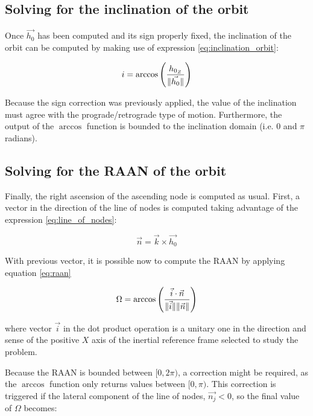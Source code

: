 \subsection{Solving for the inclination of the orbit}

Once $\vec{h_{0}}$ has been computed and its sign properly fixed, the
inclination of the orbit can be computed by making use of expression
\ref{eq:inclination_orbit}:

\begin{equation}
  i = \arccos{\left(\frac{h_{0_{Z}}}{\lVert\vec{h_{0}}\rVert} \right)}
  \label{eq:inclination_orbit}
\end{equation}

Because the sign correction was previously applied, the value of the inclination
must agree with the prograde/retrograde type of motion. Furthermore, the output
of the $\arccos$ function is bounded to the inclination domain (i.e. $0$ and
$\pi$ radians).


\subsection{Solving for the RAAN of the orbit}

Finally, the right ascension of the ascending node is computed as usual. First,
a vector in the direction of the line of nodes is computed taking advantage of
the expression \ref{eq:line_of_nodes}:

\begin{equation}
  \vec{n} = \vec{k} \times \vec{h_{0}}
  \label{eq:line_of_nodes}
\end{equation}

With previous vector, it is possible now to compute the RAAN by applying
equation \ref{eq:raan}

\begin{equation}
  \Omega = \arccos{\left(\frac{\vec{i} \cdot \vec{n}}{\lVert\vec{i}\rVert
      \lVert\vec{n}\rVert}\right)}
  \label{eq:raan}
\end{equation}

where vector $\vec{i}$ in the dot product operation is a unitary one in the
direction and sense of the positive $X$ axis of the inertial reference frame
selected to study the problem.

Because the RAAN is bounded between $[0,2\pi)$, a correction might be required,
as the $\arccos$ function only returns values between $[0,\pi)$. This correction
is triggered if the lateral component of the line of nodes, $\vec{n_{j}} < 0$,
so the final value of $\Omega$ becomes:

